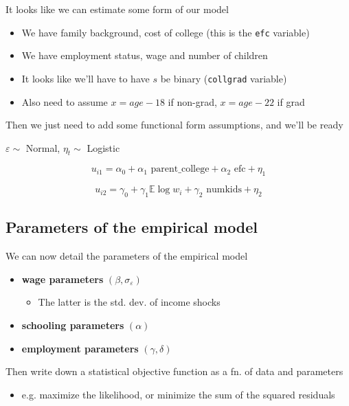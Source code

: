 \documentclass[11pt]{article}
\begin{document}
It looks like we can estimate some form of our model

\begin{itemize}
\item We have family background, cost of college (this is the \texttt{efc} variable)
\item We have employment status, wage and number of children
\item It looks like we'll have to have \(s\) be binary (\texttt{collgrad} variable)
\item Also need to assume \(x = age - 18\) if non-grad, \(x = age - 22\) if grad  \cite{mincer1974}
\end{itemize}

Then we just need to add some functional form assumptions, and we'll be ready

\(\varepsilon \sim\) Normal, \(\eta_t \sim\) Logistic

$$u_{i1} = \alpha_0 + \alpha_1 \text{ parent\_college} + \alpha_2 \text{ efc} + \eta_1$$

$$u_{i2} = \gamma_0 + \gamma_1 \mathbb{E} \log w_{i} + \gamma_2 \text{ numkids} + \eta_2$$

\subsection{Parameters of the empirical model}
\label{sec:orgda7366d}

We can now detail the parameters of the empirical model

\begin{itemize}
\item \textbf{wage parameters} \((\beta,\sigma_{\varepsilon})\)
\begin{itemize}
\item The latter is the std. dev. of income shocks
\end{itemize}
\item \textbf{schooling parameters} \((\alpha)\)
\item \textbf{employment parameters} \((\gamma,\delta)\)
\end{itemize}

Then write down a statistical objective function as a fn. of data and parameters

\begin{itemize}
\item e.g. maximize the likelihood, or minimize the sum of the squared residuals
\end{itemize}
\end{document}
